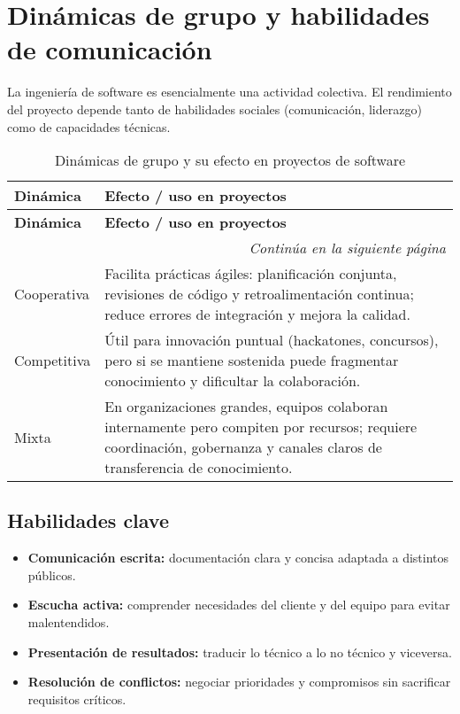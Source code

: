 \section{Dinámicas de grupo y habilidades de comunicación}
La ingeniería de software es esencialmente una actividad colectiva. El rendimiento del proyecto depende tanto de habilidades sociales (comunicación, liderazgo) como de capacidades técnicas.

\begin{longtable}{p{4cm} p{11cm}}
\caption{Dinámicas de grupo y su efecto en proyectos de software} \\
\toprule
\textbf{Dinámica} & \textbf{Efecto / uso en proyectos} \\
\midrule
\endfirsthead

\toprule
\textbf{Dinámica} & \textbf{Efecto / uso en proyectos} \\
\midrule
\endhead

\multicolumn{2}{r}{\textit{Continúa en la siguiente página}} \\
\endfoot

\bottomrule
\endlastfoot

Cooperativa & Facilita prácticas ágiles: planificación conjunta, revisiones de código y retroalimentación continua; reduce errores de integración y mejora la calidad. \\

Competitiva & Útil para innovación puntual (hackatones, concursos), pero si se mantiene sostenida puede fragmentar conocimiento y dificultar la colaboración. \\

Mixta & En organizaciones grandes, equipos colaboran internamente pero compiten por recursos; requiere coordinación, gobernanza y canales claros de transferencia de conocimiento. \\
\end{longtable}

\subsection*{Habilidades clave}
\begin{itemize}
  \item \textbf{Comunicación escrita:} documentación clara y concisa adaptada a distintos públicos.
  \item \textbf{Escucha activa:} comprender necesidades del cliente y del equipo para evitar malentendidos.
  \item \textbf{Presentación de resultados:} traducir lo técnico a lo no técnico y viceversa.
  \item \textbf{Resolución de conflictos:} negociar prioridades y compromisos sin sacrificar requisitos críticos.
\end{itemize}

